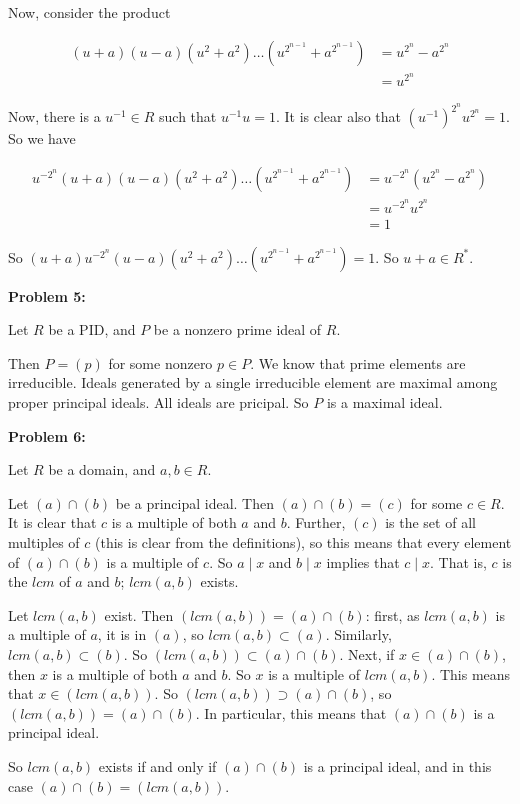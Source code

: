 \documentclass[a4paper,12pt]{article}
\newcommand{\shunt}{\vspace{20mm}}
\begin{document}
Now, consider the product

\begin{align*}
(u+a)(u-a)(u^2+a^2)\ldots(u^{2^{n-1}}+a^{2^{n-1}}) &= u^{2^n} - a^{2^n}\\
&=u^{2^n}
\end{align*}

Now, there is a $u^{-1} \in R$ such that $u^{-1}u=1$. It is clear also that $(u^{-1})^{2^n}u^{2^n} = 1$. So we have

\begin{align*}
u^{-2^n}(u+a)(u-a)(u^2+a^2)\ldots(u^{2^{n-1}}+a^{2^{n-1}}) &= u^{-2^n}(u^{2^n} - a^{2^n})\\
&=u^{-2^n}u^{2^n}\\
&=1
\end{align*}

So $(u+a)u^{-2^n}(u-a)(u^2+a^2)\ldots(u^{2^{n-1}}+a^{2^{n-1}})=1$. So $u+a \in R^*$.

\shunt

{\bf Problem 5:}

Let $R$ be a PID, and $P$ be a nonzero prime ideal of $R$.

Then $P = (p)$ for some nonzero $p \in P$. We know that prime elements are irreducible. Ideals generated by a single irreducible element are maximal among proper principal ideals. All ideals are pricipal. So $P$ is a maximal ideal.

\shunt

{\bf Problem 6:}

Let $R$ be a domain, and $a, b \in R$.

Let $(a) \cap (b)$ be a principal ideal. Then $(a) \cap (b) = (c)$ for some $c \in R$. It is clear that $c$ is a multiple of both $a$ and $b$. Further, $(c)$ is the set of all multiples of $c$ (this is clear from the definitions), so this means that every element of $(a) \cap (b)$ is a multiple of $c$. So $a \mid x$ and $b \mid x$ implies that $c \mid x$. That is, $c$ is the $lcm$ of $a$ and $b$; $lcm(a,b)$ exists.

Let $lcm(a,b)$ exist. Then $(lcm(a,b)) = (a) \cap (b)$: first, as $lcm(a,b)$ is a multiple of $a$, it is in $(a)$, so $lcm(a,b) \subset (a)$. Similarly, $lcm(a,b) \subset (b)$. So $(lcm(a,b)) \subset (a) \cap (b)$. Next, if $x \in (a) \cap (b)$, then $x$ is a multiple of both $a$ and $b$. So $x$ is a multiple of $lcm(a,b)$. This means that $x \in (lcm(a,b))$. So $(lcm(a,b)) \supset (a) \cap (b)$, so $(lcm(a,b)) = (a) \cap (b)$. In particular, this means that $(a) \cap (b)$ is a principal ideal.

So $lcm(a,b)$ exists if and only if $(a) \cap (b)$ is a principal ideal, and in this case $(a) \cap (b) = (lcm(a,b))$.

\shunt
\end{document}
